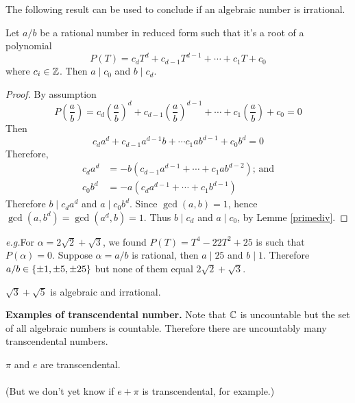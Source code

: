\vspace*{1em}

The following result can be used to conclude if an algebraic number is irrational.
\vspace*{0.5em}
\begin{theorem}
Let $a/b$ be a rational number in reduced form such that it's a root of a polynomial
\[P(T) = c_dT^d + c_{d-1}T^{d-1} + \cdots + c_1T + c_0\]
where $c_i \in \mathbb Z$. Then $a\mid c_0$ and $b\mid c_d$.
\end{theorem}
\begin{proof}
By assumption
\[P\left(\frac{a}{b}\right) = c_d\left(\frac{a}{b}\right)^d + c_{d-1}\left(\frac{a}{b}\right)^{d-1} + \cdots + c_1\left(\frac{a}{b}\right) + c_0 = 0\]
Then
\[c_da^d + c_{d-1}a^{d-1}b + \cdots c_1ab^{d-1} + c_0b^d = 0\]
Therefore,
\begin{align*}
c_da^d &= -b(c_{d-1}a^{d-1}+\cdots + c_1ab^{d-2})\text{; and}\\[0.5em]
c_0b^d &= -a(c_da^{d-1} +\cdots + c_1b^{d-1})
\end{align*}
Therefore $b\mid c_da^d$ and $a\mid c_0b^d$. Since $\gcd(a,b) = 1$, hence $\gcd(a,b^d) = \gcd(a^d,b) = 1$. Thus $b\mid c_d$ and $a\mid c_0$, by Lemme \ref{primediv}.
\end{proof}

\emph{e.g.}\quad For $\alpha = 2\sqrt{2} + \sqrt{3}$, we found $P(T) = T^4 - 22T^2 + 25$ is such that $P(\alpha) = 0$. Suppose $\alpha = a/b$ is rational, then $a\mid 25$ and $b\mid 1$. Therefore $a/b \in \left\{\pm 1, \pm 5, \pm 25\right\}$ but none of them equal $2\sqrt{2} + \sqrt{3}$.

\vspace*{1em}

\begin{example}[in-class]
$\sqrt{3} + \sqrt{5}$ is algebraic and irrational.
\end{example}

\vspace*{1em}

{\bf Examples of transcendental number.} Note that $\mathbb C$ is uncountable but the set of all algebraic numbers is countable. Therefore there are uncountably many transcendental numbers.

\vspace*{1em}

\begin{theorem}
$\pi$ and $e$ are transcendental.\\
\\
\textnormal{(But we don't yet know if $e + \pi$ is transcendental, for example.)}
\end{theorem}

